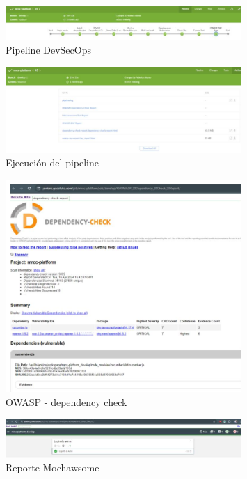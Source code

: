 \begin{figure}[H]
    \centering
    \includegraphics[width=0.8\textwidth]{../imagenes/secciones/7-Gestion-de-la-configuracion/Pipeline DevSecOps.jpg}
    \caption{Pipeline DevSecOps}
    \label{fig:devsecops}
\end{figure}

\begin{figure}[H]
    \centering
    \includegraphics[width=0.8\textwidth]{../imagenes/secciones/7-Gestion-de-la-configuracion/ejecucion pipeline.jpg}
    \caption{Ejecución del pipeline}
    \label{fig:ejePipeline}
\end{figure}

\begin{figure}[H]
    \centering
    \includegraphics[width=0.8\textwidth]{../imagenes/secciones/7-Gestion-de-la-configuracion/OWASP - dependency check.jpg}
    \caption{OWASP - dependency check}
    \label{fig:owasp}
\end{figure}

\begin{figure}[H]
    \centering
    \includegraphics[width=0.8\textwidth]{../imagenes/secciones/7-Gestion-de-la-configuracion/Mochawsome report.jpg}
    \caption{Reporte Mochawsome}
    \label{fig:mochawsome}
\end{figure}


